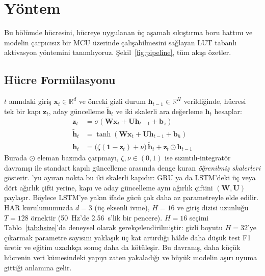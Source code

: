 \section{Yöntem}
\label{sec:method}

Bu bölümde \fastgrnn{} hücresini, hücreye uygulanan üç aşamalı
sıkıştırma boru hattını ve modelin çarpıcısız bir MCU üzerinde
çalışabilmesini sağlayan LUT tabanlı aktivasyon yöntemini tanımlıyoruz.
Şekil~\ref{fig:pipeline}, tüm akışı özetler.

\subsection{\fastgrnn{} Hücre Formülasyonu}
\label{sec:method:cell}

$t$ anındaki giriş $\mathbf{x}_t \in \mathbb{R}^{d}$ ve önceki gizli
durum $\mathbf{h}_{t-1} \in \mathbb{R}^{H}$ verildiğinde,
\fastgrnn{} hücresi~\cite{kusupati2018fastgrnn} tek bir kapı
$\mathbf{z}_t$, aday güncelleme $\tilde{\mathbf{h}}_t$ ve iki
skalerli ara değerleme $\mathbf{h}_t$ hesaplar:
\begin{align}
\mathbf{z}_t &= \sigma(\mathbf{W} \mathbf{x}_t + \mathbf{U} \mathbf{h}_{t-1} + \mathbf{b}_z) \label{eq:z}\\
\tilde{\mathbf{h}}_t &= \tanh(\mathbf{W} \mathbf{x}_t + \mathbf{U} \mathbf{h}_{t-1} + \mathbf{b}_h) \label{eq:htilde}\\
\mathbf{h}_t &= \bigl(\zeta(\mathbf{1} - \mathbf{z}_t) + \nu\bigr)\, \tilde{\mathbf{h}}_t + \mathbf{z}_t \odot \mathbf{h}_{t-1} \label{eq:hupdate}
\end{align}
Burada $\odot$ eleman bazında çarpmayı, $\zeta, \nu \in (0,1)$ ise
sızıntılı-integratör davranışı ile standart kapılı güncelleme arasında
denge kuran \emph{öğrenilmiş skalerleri} gösterir. \fastgrnn{}'yu
ayıran nokta bu iki skalerli kapıdır: GRU ya da LSTM'deki üç veya
dört ağırlık çifti yerine, kapı ve aday güncelleme aynı ağırlık
çiftini $(\mathbf{W}, \mathbf{U})$ paylaşır. Böylece LSTM'ye yakın
ifade gücü çok daha az parametreyle elde edilir. HAR kurulumumuzda
$d{=}3$ (üç eksenli ivme),
$H{=}16$ ve giriş dizisi uzunluğu $T{=}128$ örnektir (50~Hz'de
2.56~s'lik bir pencere). $H{=}16$ seçimi Tablo~\ref{tab:hsize}'da
deneysel olarak gerekçelendirilmiştir: gizli boyutu $H{=}32$'ye
çıkarmak parametre sayısını yaklaşık üç kat artırdığı hâlde daha
düşük test F1 üretir ve eğitim uzadıkça sonuç daha da kötüleşir.
Bu davranış, daha küçük hücrenin veri kümesindeki yapıyı zaten
yakaladığı ve büyük modelin aşırı uyuma gittiği anlamına gelir.

